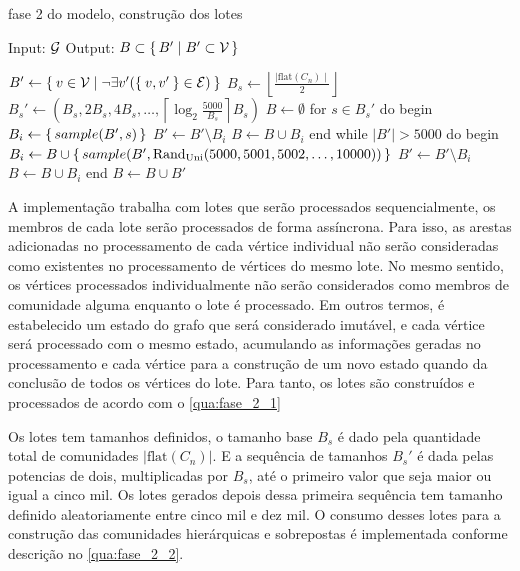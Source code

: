 \documentclass[notes.tex]{subfiles}
\begin{document}
\begin{quadro}[Bbhtp]
\caption{fase 2 do modelo, construção dos lotes}
\label{qua:fase_2_1}
\begin{algorithm}
Input: $\operatorname{\mathcal{G}}$
Output: $B \subset \set{B' | B' \subset \operatorname{\mathcal{V}}}$

$B' \leftarrow \Set{v \in \operatorname{\mathcal{V}}| \neg \exists v'(\Set{v, v'} \in \operatorname{\mathcal{E}})}$
$B_s \leftarrow  \left\lfloor  \frac{\mid \text{flat}(C_n) \mid}{2}  \right\rfloor$
$B_s' \leftarrow (B_s, 2B_s, 4B_s, \ldots , \left\lceil \log_2\frac{5000}{B_s} \right\rceil  B_s)$
$B \leftarrow \emptyset$
for $s \in B_s'$ do
begin
    $B_i \leftarrow \set{sample(B', s)}$ 
    $B' \leftarrow B' \setminus B_i$ 
    $B \leftarrow B \cup B_i$ 
end
while $|B'| > 5000$ do
begin
    $B_i \leftarrow B \cup \set{sample(B', \text{Rand}_\text{Uni}({5000, 5001, 5002, \ldots, 10000}))}$
    $B' \leftarrow B' \setminus B_i$ 
    $B \leftarrow B \cup B_i$ 
end
$B \leftarrow B \cup B'$ 
\end{algorithm}
\end{quadro}

A implementação trabalha com lotes que serão processados sequencialmente, os membros de cada lote serão processados de forma assíncrona.
Para isso, as arestas adicionadas no processamento de cada vértice individual não serão consideradas como existentes no processamento de vértices do mesmo lote.
No mesmo sentido, os vértices processados individualmente não serão considerados como membros de comunidade alguma enquanto o lote é processado.
Em outros termos, é estabelecido um estado do grafo que será considerado imutável, e cada vértice será processado com o mesmo estado, acumulando as informações geradas no processamento e cada vértice para a construção de um novo estado quando da conclusão de todos os vértices do lote.
Para tanto, os lotes são construídos e processados de acordo com o \autoref{qua:fase_2_1}

Os lotes tem tamanhos definidos, o tamanho base $B_s$ é dado pela quantidade total de comunidades $|\text{flat}(C_n)|$.
E a sequência de tamanhos $B_s'$ é dada pelas potencias de dois, multiplicadas por $B_s$, até o primeiro valor que seja maior ou igual a cinco mil.
Os lotes gerados depois dessa primeira sequência tem tamanho definido aleatoriamente entre cinco mil e dez mil.
O consumo desses lotes para a construção das comunidades hierárquicas e sobrepostas é implementada conforme descrição no \autoref{qua:fase_2_2}.
\end{document}
